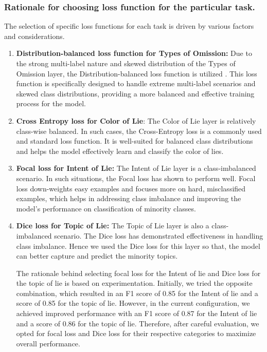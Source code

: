 \subsubsection{Rationale for choosing loss function for the particular task.}

The selection of specific loss functions for each task is driven by various factors and considerations. 

\begin{enumerate}

    \item \textbf{Distribution-balanced loss function for Types of Omission:} Due to the strong multi-label nature and skewed distribution of the Types of Omission layer, the Distribution-balanced loss function is utilized \cite{huang-etal-2021-balancing}. This loss function is specifically designed to handle extreme multi-label scenarios and skewed class distributions, providing a more balanced and effective training process for the model.


    \item \textbf{Cross Entropy loss for Color of Lie}:
The Color of Lie layer is relatively class-wise balanced. In such cases, the Cross-Entropy loss is a commonly used and standard loss function. It is well-suited for balanced class distributions and helps the model effectively learn and classify the color of lies.

    \item \textbf{Focal loss for Intent of Lie:}  The Intent of Lie layer is a class-imbalanced scenario. In such situations, the Focal loss has shown to perform well. Focal loss down-weights easy examples and focuses more on hard, misclassified examples, which helps in addressing class imbalance and improving the model's performance on classification of minority classes.

    \item \textbf{Dice loss for Topic of Lie:} The Topic of Lie layer is also a class-imbalanced scenario. The Dice loss has demonstrated effectiveness in handling class imbalance. Hence we used the Dice loss for this layer so that, the model can better capture and predict the minority topics. 


The rationale behind selecting focal loss for the Intent of lie and Dice loss for the topic of lie is based on experimentation. Initially, we tried the opposite combination, which resulted in an F1 score of 0.85 for the Intent of lie and a score of 0.85 for the topic of lie. However, in the current configuration, we achieved improved performance with an F1 score of 0.87 for the Intent of lie and a score of 0.86 for the topic of lie. Therefore, after careful evaluation, we opted for focal loss and Dice loss for their respective categories to maximize overall performance.



\end{enumerate}



